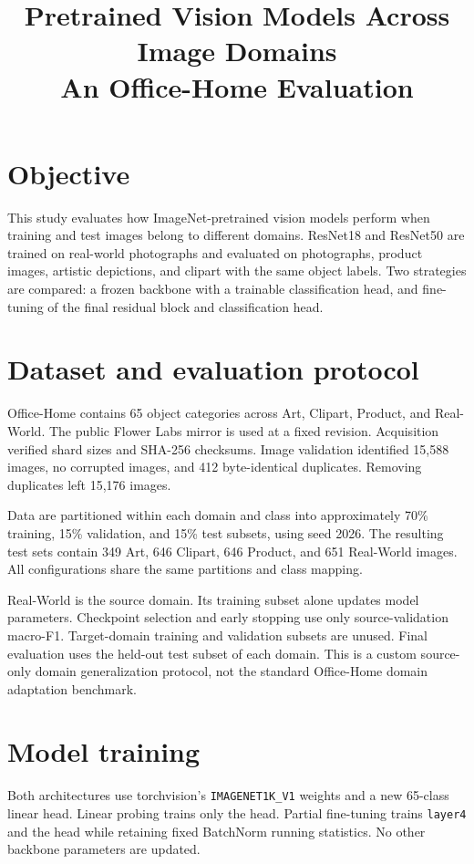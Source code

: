 \documentclass{article}
\title{Pretrained Vision Models Across Image Domains\\An Office-Home Evaluation}
\author{}
\date{}
\begin{document}
\maketitle

\section{Objective}
This study evaluates how ImageNet-pretrained vision models perform when training and test images belong to different domains. ResNet18 and ResNet50 are trained on real-world photographs and evaluated on photographs, product images, artistic depictions, and clipart with the same object labels. Two strategies are compared: a frozen backbone with a trainable classification head, and fine-tuning of the final residual block and classification head.

\section{Dataset and evaluation protocol}
Office-Home contains 65 object categories across Art, Clipart, Product, and Real-World. The public Flower Labs mirror is used at a fixed revision. Acquisition verified shard sizes and SHA-256 checksums. Image validation identified 15,588 images, no corrupted images, and 412 byte-identical duplicates. Removing duplicates left 15,176 images.

Data are partitioned within each domain and class into approximately 70\% training, 15\% validation, and 15\% test subsets, using seed 2026. The resulting test sets contain 349 Art, 646 Clipart, 646 Product, and 651 Real-World images. All configurations share the same partitions and class mapping.

Real-World is the source domain. Its training subset alone updates model parameters. Checkpoint selection and early stopping use only source-validation macro-F1. Target-domain training and validation subsets are unused. Final evaluation uses the held-out test subset of each domain. This is a custom source-only domain generalization protocol, not the standard Office-Home domain adaptation benchmark.

\section{Model training}
Both architectures use torchvision's \texttt{IMAGENET1K\_V1} weights and a new 65-class linear head. Linear probing trains only the head. Partial fine-tuning trains \texttt{layer4} and the head while retaining fixed BatchNorm running statistics. No other backbone parameters are updated.
\end{document}
